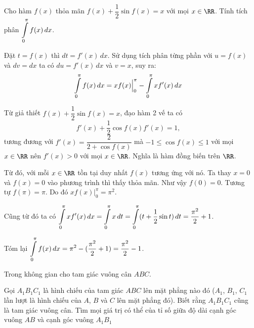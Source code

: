 \begin{problem}[Bài 5]
    Cho hàm $f(x)$ thỏa mãn $f(x) + \dfrac{1}{2} \sin f(x) = x$ với mọi $x \in \RR$. Tính tích phân $\displaystyle{\int\displaylimits_{0}^{\pi} f(x)\,dx}$.
\end{problem}

\begin{solution}
    Đặt $t = f(x)$ thì $dt = f'(x)\,dx$. Sử dụng tích phân từng
    phần với $u = f(x)$ và $dv = dx$ ta có $du = f'(x)\,dx$ và
    $v = x$, suy ra:
    \[\int\displaylimits_{0}^{\pi} f(x)\,dx = x f(x) \Big|^\pi_0 - \int\displaylimits_{0}^{\pi}x f'(x)\,dx\]

    Từ giả thiết $f(x) + \dfrac{1}{2} \sin f(x) = x$, đạo hàm 2 vế ta có 
    \[f'(x) + \dfrac{1}{2} \cos f(x) f'(x) = 1,\]
    tương đương với $f'(x) = \dfrac{2}{2 + \cos f(x)}$ mà $-1 \leqslant \cos f(x) \leqslant 1$
    với mọi $x \in \RR$ nên $f'(x) > 0$ với mọi $x \in \RR$. Nghĩa
    là hàm đồng biến trên $\RR$.

    Từ đó, với mỗi $x \in \RR$ tồn tại duy nhất $f(x)$ tương ứng
    với nó. Ta thay $x = 0$ và $f(x) = 0$ vào phương trình thì 
    thấy thỏa mãn. Như vậy $f(0) = 0$. Tương tự $f(\pi) = \pi$.
    Do đó $x f(x) \Big|^\pi_0 = \pi^2$.

    Cũng từ đó ta có $\displaystyle{\int\displaylimits_{0}^{\pi} x f'(x)\,dx = \int\displaylimits_{0}^{\pi} x \, dt = \int\displaylimits_{0}^{\pi} (t + \dfrac{1}{2} \sin t)\,dt = \dfrac{\pi^2}{2} + 1}$.
    
    Tóm lại $\displaystyle{\int\displaylimits_{0}^{\pi}f(x)\,dx = \pi^2 - (\dfrac{\pi^2}{2} + 1)
    = \frac{\pi^2}{2} - 1}$.
\end{solution}

\begin{problem}[Bài 6]
    Trong không gian cho tam giác vuông cân $ABC$. 
    
    Gọi $A_1 B_1 C_1$ là hình chiếu của tam giác $ABC$ lên mặt phẳng nào đó ($A_1$, $B_1$, $C_1$
    lần lượt là hình chiếu của $A$, $B$ và $C$ lên mặt phẳng đó).
    Biết rằng $A_1 B_1 C_1$ cũng là tam giác vuông cân. Tìm mọi giá
    trị có thể của tỉ số giữa độ dài cạnh góc vuông $AB$ và cạnh
    góc vuông $A_1 B_1$
\end{problem}


